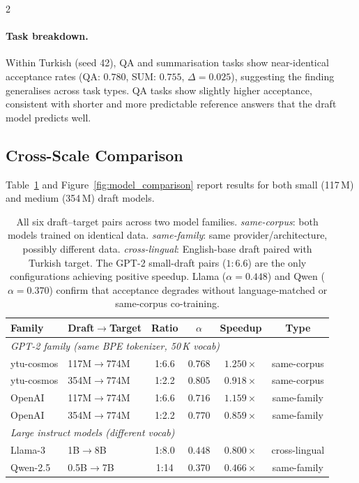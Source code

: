 \documentclass[11pt,a4paper]{article}
\begin{document}
\begin{multicols}{2}
\paragraph{Task breakdown.}
Within Turkish (seed 42), QA and summarisation tasks show near-identical
acceptance rates (QA: $0.780$, SUM: $0.755$, $\Delta=0.025$), suggesting
the finding generalises across task types.
QA tasks show slightly higher acceptance, consistent with shorter and
more predictable reference answers that the draft model predicts well.

\subsection{Cross-Scale Comparison}
\label{sec:scale}

Table~\ref{tab:scale} and Figure~\ref{fig:model_comparison} report results
for both small (117\,M) and medium (354\,M) draft models.

\begin{table}[t]
\centering
\small
\setlength{\tabcolsep}{4pt}
\begin{tabular}{llcccc}
\toprule
\textbf{Family} & \textbf{Draft$\to$Target} &
\textbf{Ratio} & \textbf{$\alpha$} & \textbf{Speedup} & \textbf{Type} \\
\midrule
\multicolumn{6}{l}{\textit{GPT-2 family (same BPE tokenizer, 50\,K vocab)}} \\
ytu-cosmos & 117M$\to$774M & 1:6.6 & $0.768$ & {\color{goodgreen}$\mathbf{1.250\times}$} & same-corpus \\
ytu-cosmos & 354M$\to$774M & 1:2.2 & $0.805$ & {\color{badred}$0.918\times$}            & same-corpus \\
OpenAI     & 117M$\to$774M & 1:6.6 & $0.716$ & {\color{goodgreen}$\mathbf{1.159\times}$} & same-family \\
OpenAI     & 354M$\to$774M & 1:2.2 & $0.770$ & {\color{badred}$0.859\times$}            & same-family \\
\midrule
\multicolumn{6}{l}{\textit{Large instruct models (different vocab)}} \\
Llama-3    & 1B$\to$8B     & 1:8.0 & $0.448$ & {\color{badred}$0.800\times$}            & cross-lingual \\
Qwen-2.5   & 0.5B$\to$7B   & 1:14  & $0.370$ & {\color{badred}$0.466\times$}            & same-family \\
\bottomrule
\end{tabular}
\caption{All six draft--target pairs across two model families.
\textit{same-corpus}: both models trained on identical data.
\textit{same-family}: same provider/architecture, possibly different data.
\textit{cross-lingual}: English-base draft paired with Turkish target.
The GPT-2 small-draft pairs ($1\!:\!6.6$) are the only configurations
achieving positive speedup.
Llama ($\alpha=0.448$) and Qwen ($\alpha=0.370$) confirm that acceptance
degrades without language-matched or same-corpus co-training.}
\label{tab:scale}
\end{table}


\end{multicols}
\end{document}
